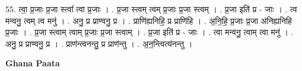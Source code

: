 \documentclass[17pt]{extarticle}
\begin{document}
55. त्वा॒ प्र॒जाः प्र॒जा स्त्वा᳚ त्वा प्र॒जाः । . प्र॒जा स्त्वम् त्वम् प्र॒जाः प्र॒जा स्त्वम् । . प्र॒जा इति॑ प्र - जाः । . त्व मन्वनु॒ त्वम् त्व मनु॑ । . अनु॒ प्र प्राण्वनु॒ प्र । . प्राणि॑ह्यनिहि॒ प्र प्राणि॑हि । . अ॒नि॒हि॒ प्र॒जाः प्र॒जा अ॑निह्यनिहि प्र॒जाः । . प्र॒जा स्त्वाम् त्वाम् प्र॒जाः प्र॒जा स्त्वाम् । . प्र॒जा इति॑ प्र - जाः । . त्वा मन्वनु॒ त्वाम् त्वा मनु॑ । . अनु॒ प्र प्राण्वनु॒ प्र । . प्राण॑न्त्वनन्तु॒ प्र प्राण॑न्तु । . अ॒न॒न्त्वित्य॑नन्तु । \newline

\textbf{Ghana Paata } \newline
\end{document}

